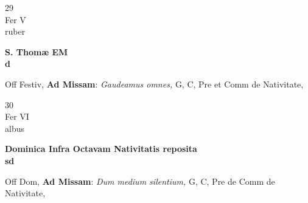 \documentclass[10pt, openany]{book}
\begin{document}
        \begin{center}
            \begin{minipage}{3.5in}
                \vspace{2em}
                \begin{minipage}{0.5in}
                    {\Huge 29} \\
                    {\normalsize Fer V} \\
                    {\normalsize ruber}
                \end{minipage}
                \begin{minipage}{3.0in}
                    \textbf{ \large S. Thomæ EM \\
                    \textnormal{\normalsize d}} \\ 
                \end{minipage}
                \begin{justify}Off Festiv, \textbf{Ad Missam}: \textit{Gaudeamus omnes,} G, C, Pre et Comm de Nativitate,  
                \end{justify}
            \end{minipage}
        \end{center}
    
        \begin{center}
            \begin{minipage}{3.5in}
                \vspace{2em}
                \begin{minipage}{0.5in}
                    {\Huge 30} \\
                    {\normalsize Fer VI} \\
                    {\normalsize albus}
                \end{minipage}
                \begin{minipage}{3.0in}
                    \textbf{ \large Dominica Infra Octavam Nativitatis reposita \\
                    \textnormal{\normalsize sd}} \\ 
                \end{minipage}
                \begin{justify}Off Dom, \textbf{Ad Missam}: \textit{Dum medium silentium,} G, C, Pre de Comm de Nativitate,  
                \end{justify}
            \end{minipage}
        \end{center}
    
\end{document}
